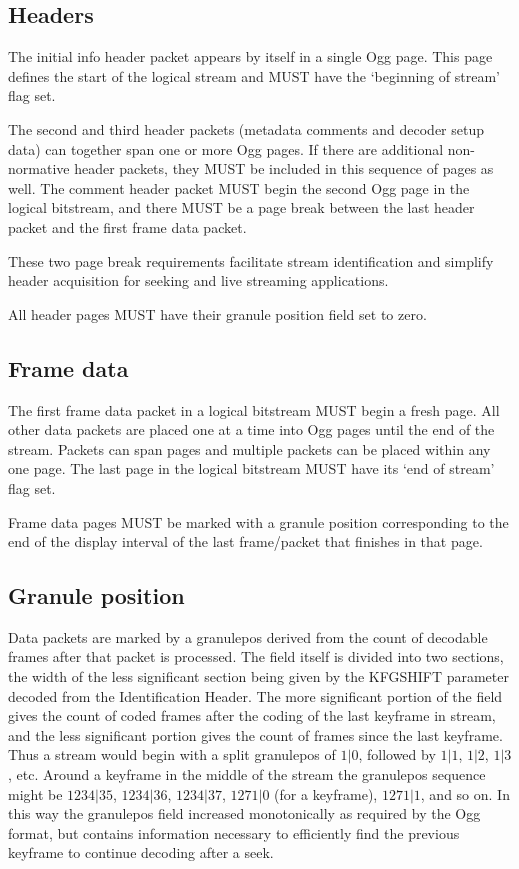 \documentclass[9pt,letterpaper]{book}
\numberwithin{equation}{chapter}
\numberwithin{figure}{chapter}
\numberwithin{table}{chapter}
\begin{document}
\subsection{Headers}

The initial info header packet appears by itself in a single Ogg page.
This page defines the start of the logical stream and MUST have
 the `beginning of stream' flag set.

The second and third header packets (metadata comments and decoder
 setup data) can together span one or more Ogg pages.
If there are additional non-normative header packets, they MUST be
 included in this sequence of pages as well.
The comment header packet MUST begin the second Ogg page in the logical
 bitstream, and there MUST be a page break between the last header
 packet and the first frame data packet.

These two page break requirements facilitate stream identification and
 simplify header acquisition for seeking and live streaming applications.

All header pages MUST have their granule position field set to zero.

\subsection{Frame data}

The first frame data packet in a logical bitstream MUST begin a fresh page.
All other data packets are placed one at a time into Ogg pages
 until the end of the stream.
Packets can span pages and multiple packets can be placed within any
 one page.
The last page in the logical bitstream MUST have its `end of stream'
 flag set.

Frame data pages MUST be marked with a granule position corresponding to
 the end of the display interval of the last frame/packet that finishes in that page.

\subsection{Granule position}

Data packets are marked by a granulepos derived from the count of decodable
frames after that packet is processed. The field itself is divided into two
sections, the width of the less significant section being given by the KFGSHIFT
parameter decoded from the Identification Header. The more significant portion
of the field gives the count of coded frames after the coding of the last keyframe
in stream, and the less significant portion gives the count of frames since
the last keyframe. Thus a stream would begin with a split granulepos of 
$1|0$, followed by $1|1$, $1|2$, $1|3$, etc. Around a keyframe in the 
middle of the stream the granulepos sequence might be $1234|35$, 
$1234|36$, $1234|37$, $1271|0$ (for a keyframe), $1271|1$, and so
on. In this way the granulepos field increased monotonically as required 
by the Ogg format, but contains information necessary to efficiently 
find the previous keyframe to continue decoding after a seek.
\end{document}
